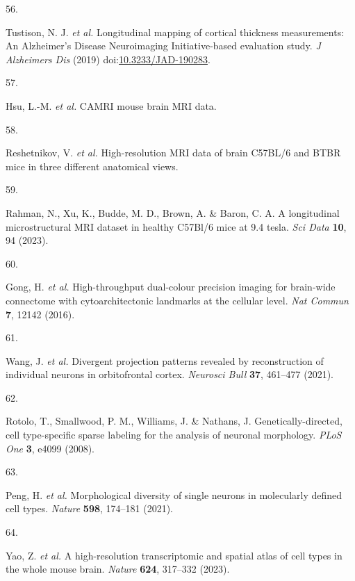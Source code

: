 \documentclass[
  12pt,
]{article}
\newlength{\cslhangindent}
\newlength{\csllabelwidth}
\newenvironment{CSLReferences}[2] %
 {%
  \setlength{\parindent}{0pt}
  \ifodd #1 \everypar{\setlength{\hangindent}{\cslhangindent}}\ignorespaces\fi
  \ifnum #2 > 0
  \setlength{\parskip}{#2\baselineskip}
  \fi
 }%
 {}
\newcommand{\CSLLeftMargin}[1]{\parbox[t]{\csllabelwidth}{#1}}
\newcommand{\CSLRightInline}[1]{\parbox[t]{\linewidth - \csllabelwidth}{#1}\break}
\begin{document}
\begin{CSLReferences}{0}{0}
\leavevmode{}%
\CSLLeftMargin{56. }
\CSLRightInline{Tustison, N. J. \emph{et al.} Longitudinal mapping of
cortical thickness measurements: An {A}lzheimer's {D}isease
{N}euroimaging {I}nitiative-based evaluation study. \emph{J Alzheimers
Dis} (2019)
doi:\href{https://doi.org/10.3233/JAD-190283}{10.3233/JAD-190283}.}

\leavevmode{}%
\CSLLeftMargin{57. }
\CSLRightInline{Hsu, L.-M. \emph{et al.} CAMRI mouse brain MRI data.}

\leavevmode{}%
\CSLLeftMargin{58. }
\CSLRightInline{Reshetnikov, V. \emph{et al.} High-resolution MRI data
of brain C57BL/6 and BTBR mice in three different anatomical views.}

\leavevmode{}%
\CSLLeftMargin{59. }
\CSLRightInline{Rahman, N., Xu, K., Budde, M. D., Brown, A. \& Baron, C.
A. A longitudinal microstructural MRI dataset in healthy C57Bl/6 mice at
9.4 tesla. \emph{Sci Data} \textbf{10}, 94 (2023).}

\leavevmode{}%
\CSLLeftMargin{60. }
\CSLRightInline{Gong, H. \emph{et al.} High-throughput dual-colour
precision imaging for brain-wide connectome with cytoarchitectonic
landmarks at the cellular level. \emph{Nat Commun} \textbf{7}, 12142
(2016).}

\leavevmode{}%
\CSLLeftMargin{61. }
\CSLRightInline{Wang, J. \emph{et al.} Divergent projection patterns
revealed by reconstruction of individual neurons in orbitofrontal
cortex. \emph{Neurosci Bull} \textbf{37}, 461--477 (2021).}

\leavevmode{}%
\CSLLeftMargin{62. }
\CSLRightInline{Rotolo, T., Smallwood, P. M., Williams, J. \& Nathans,
J. Genetically-directed, cell type-specific sparse labeling for the
analysis of neuronal morphology. \emph{PLoS One} \textbf{3}, e4099
(2008).}

\leavevmode{}%
\CSLLeftMargin{63. }
\CSLRightInline{Peng, H. \emph{et al.} Morphological diversity of single
neurons in molecularly defined cell types. \emph{Nature} \textbf{598},
174--181 (2021).}

\leavevmode{}%
\CSLLeftMargin{64. }
\CSLRightInline{Yao, Z. \emph{et al.} A high-resolution transcriptomic
and spatial atlas of cell types in the whole mouse brain. \emph{Nature}
\textbf{624}, 317--332 (2023).}


\end{CSLReferences}
\end{document}
